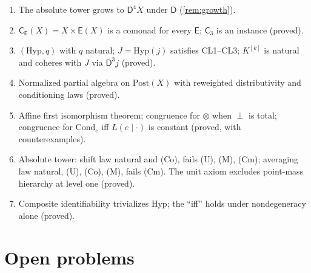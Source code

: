 \documentclass[11pt]{article}
\theoremstyle{definition}
\theoremstyle{remark}
\newcommand{\D}{\mathsf{D}}
\newcommand{\Hyp}{\mathrm{Hyp}}
\newcommand{\Post}{\mathrm{Post}}
\newcommand{\Cond}{\mathrm{Cond}}
\newcommand{\C}{\mathsf{C}}
\newcommand{\E}{\mathsf{E}}
\begin{document}
\begin{enumerate}[leftmargin=*]
\item The absolute tower grows to $\D^4X$ under $\D$ (\cref{rem:growth}).
\item $\C_\E(X)=X\times\E(X)$ is a comonad for every $\E$; $\C_3$ is an instance (proved).
\item $(\Hyp,q)$ with $q$ natural; $J=\Hyp(j)$ satisfies CL1--CL3; $K^{[k]}$ is natural and coheres
  with $J$ via $\D^3j$ (proved).
\item Normalized partial algebra on $\Post(X)$ with reweighted distributivity and conditioning laws
  (proved).
\item Affine first isomorphism theorem; congruence for $\otimes$ when $\perp$ is total; congruence for
  $\Cond_e$ iff $L(e\mid\cdot)$ is constant (proved, with counterexamples).
\item Absolute tower: shift law natural and (Co), fails (U), (M), (Cm); averaging law natural,
  (U), (Co), (M), fails (Cm). The unit axiom excludes point-mass hierarchy at level one (proved).
\item Composite identifiability trivializes $\Hyp$; the ``iff'' holds under nondegeneracy alone (proved).
\end{enumerate}

\section{Open problems}
\end{document}
